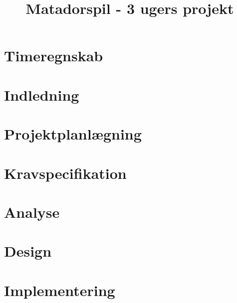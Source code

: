 \documentclass[12pt,oneside,a4paper,english]{article}
\title{Matadorspil - 3 ugers projekt} %
\begin{document}


\newpage

\thispagestyle{fancy}

\newpage
\doublespacing
\renewcommand{\baselinestretch}{1}\normalsize
\tableofcontents
\renewcommand{\baselinestretch}{1}\normalsize
\thispagestyle{fancy} %

\newpage
\section{Timeregnskab}

\thispagestyle{fancy}

\newpage
\section{Indledning}
\thispagestyle{fancy}


\newpage
\section{Projektplanlægning}

\thispagestyle{fancy}

\newpage
\thispagestyle{fancy}
\section{Kravspecifikation}


\newpage
\section{Analyse}

\thispagestyle{fancy}

\newpage
\section{Design}

\thispagestyle{fancy}

\newpage
\section{Implementering}
{}
\thispagestyle{fancy}
\end{document}
